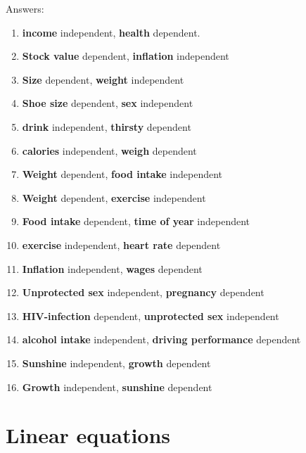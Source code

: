 \documentclass[]{report}\usepackage[]{graphicx}\usepackage[]{color}
\begin{document}
Answers:

\begin{enumerate}

\item \textbf{income} independent, \textbf{health} dependent.
\item \textbf{Stock value} dependent, \textbf{inflation} independent
\item \textbf{Size} dependent, \textbf{weight} independent
\item \textbf{Shoe size} dependent, \textbf{sex} independent
\item \textbf{drink} independent, \textbf{thirsty} dependent
\item \textbf{calories} independent, \textbf{weigh} dependent
\item \textbf{Weight} dependent, \textbf{food intake} independent
\item \textbf{Weight} dependent, \textbf{exercise} independent
\item \textbf{Food intake} dependent, \textbf{time of year} independent
\item \textbf{exercise} independent, \textbf{heart rate} dependent
\item \textbf{Inflation} independent, \textbf{wages} dependent
\item \textbf{Unprotected sex} independent, \textbf{pregnancy} dependent
\item \textbf{HIV-infection} dependent, \textbf{unprotected sex} independent
\item \textbf{alcohol intake} independent, \textbf{driving performance} dependent
\item \textbf{Sunshine} independent, \textbf{growth} dependent
\item \textbf{Growth} independent, \textbf{sunshine} dependent

\end{enumerate}



\section{Linear equations}
\end{document}
